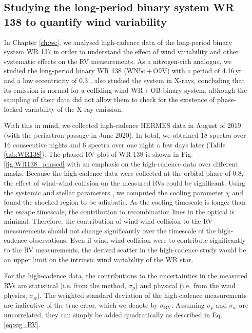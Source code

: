 \subsection{Studying the long-period binary system WR 138 to quantify wind variability} \label{sect:windVariability}
 
In Chapter \ref{ch:wc}, we analysed high-cadence data of the long-period binary system WR 137 in order to understand the effect of wind variability and other systematic effects on the RV measurements. As a nitrogen-rich analogue, we studied the long-period binary WR 138 (WN5o\,+\,O9V) with a period of 4.16\,yr and a low eccentricity of 0.3 \citep{2013Palate,1990Annuk,2016Richardson}. \citet{2013Palate} also studied the system in X-rays, concluding that its emission is normal for a colliding-wind WR\,+\,OB binary system, although the sampling of their data did not allow them to check for the existence of phase-locked variability of the X-ray emission.
 
With this in mind, we collected high-cadence HERMES data in August of 2019 (with the periastron passage in June 2020). In total, we obtained 18 spectra over 16 consecutive nights and 6 spectra over one night a few days later (Table \ref{tab:WR138}). The phased RV plot of WR 138 is shown in Fig. \ref{fig:WR138_phased} with an emphasis on the high-cadence data over different masks. Because the high-cadence data were collected at the orbital phase of 0.8, the effect of wind-wind collision \citep[e.g.][]{2002Luehrs} on the measured RVs could be significant. Using the systemic and stellar parameters \citep{1990Annuk,2016Richardson}, we computed the cooling parameter $\chi$ \citep{1992Stevens} and found the shocked region to be adiabatic. As the cooling timescale is longer than the escape timescale, the contribution to recombination lines in the optical is minimal. Therefore, the contribution of wind-wind collision to the RV measurements should not change significantly over the timescale of the high-cadence observations. Even if wind-wind collision were to contribute significantly to the RV measurements, the derived scatter in the high-cadence study would be an upper limit on the intrinsic wind variability of the WR star.

    
For the high-cadence data, the contributions to the uncertainties in the measured RVs are statistical (i.e. from the method, $\sigma_p$) and physical (i.e. from the wind physics, $\sigma_w$). The weighted standard deviation of the high-cadence measurements are indicative of the true error, which we denote by $\sigma_{\textrm{RV}}$. Assuming $\sigma_p$ and $\sigma_w$ are uncorrelated, they can simply be added quadratically as described in Eq. \ref{eq:sig_RV}.

